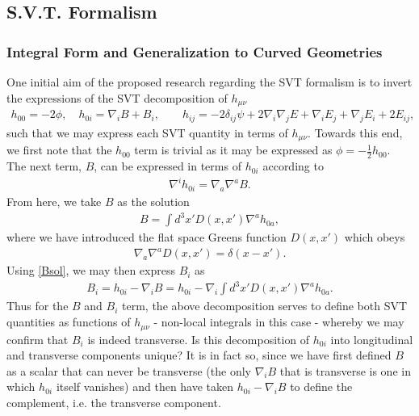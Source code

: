 \documentclass[10pt,letterpaper]{article}
\numberwithin{equation}{section}
\begin{document}
\subsection{S.V.T. Formalism}
\label{sec:S.V.T. Formalism}
%
\subsubsection{Integral Form and Generalization to Curved Geometries}
\label{sec:Integral Form and Generalization to Curved Geometries}
One initial aim of the proposed research regarding the SVT formalism is to invert the expressions of the SVT decomposition of $h_{\mu\nu}$
\begin{eqnarray}
h_{00} = -2\phi,\quad h_{0i} = \nabla_i B + B_i,\qquad h_{ij} = -2\delta_{ij}\psi + 2\nabla_i\nabla_j E + \nabla_i E_j + \nabla_j E_i + 2 E_{ij},
\end{eqnarray}
such that we may express each SVT quantity in terms of $h_{\mu\nu}$. Towards this end, we first note that the $h_{00}$ term is trivial as it may be expressed as $\phi = -\tfrac{1}{2}h_{00}$. The next term, $B$, can be expressed in terms of $h_{0i}$ according to
\begin{eqnarray}
\nabla^i h_{0i} = \nabla_a\nabla^a B.
\end{eqnarray}
From here, we take $B$ as the solution
\begin{eqnarray}
B = \int d^3x' D(x,x') \nabla^a h_{0a},
\label{Bsol}
\end{eqnarray}
where we have introduced the flat space Greens function $D(x,x')$ which obeys
\begin{eqnarray}
\nabla_a\nabla^a D(x,x') = \delta (x-x').
\end{eqnarray}
Using \eqref{Bsol}, we may then express $B_i$ as
\begin{eqnarray}
B_i = h_{0i} - \nabla_i B = h_{0i} - \nabla_i \int d^3x' D(x,x') \nabla^a h_{0a}. 
\label{Bisol}
\end{eqnarray}
Thus for the $B$ and $B_i$ term, the above decomposition serves to define both SVT quantities as functions of $h_{\mu\nu}$ - non-local integrals in this case - whereby we may confirm that $B_i$ is indeed transverse. Is this decomposition of $h_{0i}$ into longitudinal and transverse components unique? It is in fact so, since we have first defined $B$ as a scalar that can never be transverse (the only $\nabla_i B$ that is transverse is one in which $h_{0i}$ itself vanishes) and then have taken $h_{0i} - \nabla_i B$ to define the complement, i.e. the transverse component. 
\end{document}
